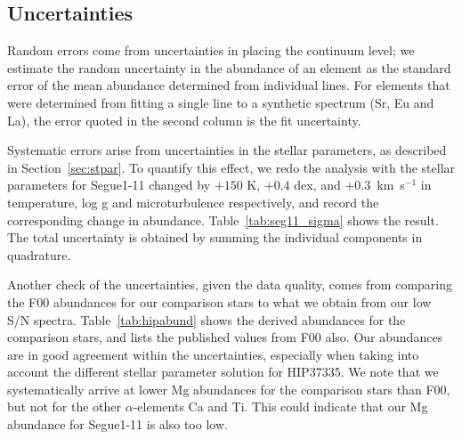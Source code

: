 \documentclass[manuscript]{aastex}
\begin{document}
\subsection{Uncertainties}
\label{sec:unc}
Random errors come from uncertainties in placing the continuum level; we estimate the random uncertainty in the abundance of an element as the standard error of the mean abundance determined from individual lines. For elements that were determined from fitting a single line to a synthetic spectrum (Sr, Eu and La), the error quoted in the second column is the fit uncertainty.

Systematic errors arise from uncertainties in the stellar parameters, as described in Section~\ref{sec:stpar}. To quantify this effect, we redo the analysis with the stellar parameters for Segue1-11 changed by $+150$ K, $+0.4$ dex, and $+0.3$~km~s$^{-1}$ in temperature, log g and microturbulence respectively, and record the corresponding change in abundance. Table~\ref{tab:seg11_sigma} shows the result. The total uncertainty is obtained by summing the individual components in quadrature.

Another check of the uncertainties, given the data quality, comes from comparing the F00 abundances for our comparison stars to what we obtain from our low S/N spectra. Table~\ref{tab:hipabund} shows the derived abundances for the comparison stars, and lists the published values from F00 also. Our abundances are in good agreement within the uncertainties, especially when taking into account the different stellar parameter solution for HIP37335. We note that we systematically arrive at lower Mg abundances for the comparison stars than F00, but not for the other $\alpha$-elements Ca and Ti. This could indicate that our Mg abundance for Segue1-11 is also too low.
\end{document}
